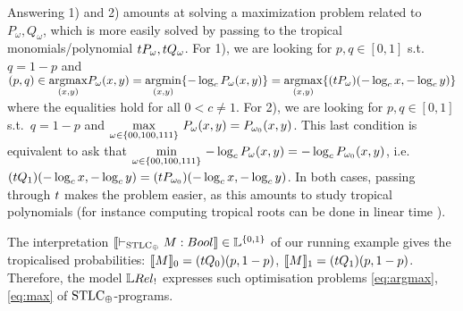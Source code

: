 Answering 1) and 2) amounts at solving a maximization problem related to $P_{\omega}, Q_\omega$, which is more easily solved by 
passing to the tropical monomials/polynomial $\trop P_{\omega},\trop Q_{\omega}$. 
For 1), we are looking for $p,q\in[0,1]$ s.t.\ $q=1-p$ and $(p,q)\in
   \underset{(x,y)}{\RM{arg max}} P_\omega (x,y)
   = %
   \underset{(x,y)}{\RM{arg min}}\set{-\log_c P_\omega (x,y)}
   =%
   \underset{(x,y)}{\RM{arg max}}\set{(\trop P_\omega) (-\log_c x,-\log_c y)} \label{eq:argmax}$
where the equalities hold for all $0<c\neq1$.
For 2), %
we are looking for $p,q\in[0,1]$ s.t.\ $q=1-p$ and
$\max\limits_{\omega\in\{00,100,111\}} \, P_\omega(x,y) = P_{\omega_0}(x,y)$.
This last condition is equivalent to ask that $\min\limits_{\omega\in\{00,100,111\}} \, -\log_c P_\omega(x,y) = -\log_c P_{\omega_0}(x,y)$, i.e.\ $(\trop Q_1)( -\log_c x, -\log_c y) = (\trop P_{\omega_0})( -\log_c x, -\log_c y)\label{eq:max}$.
In both cases, passing through $\trop $ %
makes the problem easier, as this amounts to study tropical polynomials (for instance computing tropical roots can be done in linear time \cite{Noferini2015}). %

\begin{remark}
 The interpretation $\model{\vdash_{\STLC_\oplus} M:\bool}\in\Lawv^{\set{0,1}}$ of our running example gives the tropicalised probabilities: $\model M_0=(\trop Q_0)(p,1-p)$, $\model M_1=(\trop Q_1)(p,1-p)$.
 Therefore, the model $\LREL_!$ expresses such optimisation problems 
 \ref{eq:argmax}, \ref{eq:max} of $\mathrm{STLC}_\oplus$-programs. 
\end{remark}



